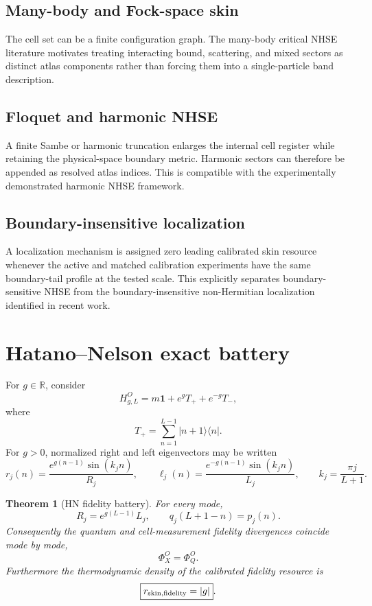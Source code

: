 \documentclass[11pt]{article}
\newtheorem{theorem}{Theorem}
\newcommand{\id}{\mathbf 1}
\newcommand{\R}{\mathbb R}
\begin{document}
\subsection{Many-body and Fock-space skin}
The cell set can be a finite configuration graph. The many-body critical NHSE literature motivates treating interacting bound, scattering, and mixed sectors as distinct atlas components rather than forcing them into a single-particle band description. \cite{ManyBodyCritical}

\subsection{Floquet and harmonic NHSE}
A finite Sambe or harmonic truncation enlarges the internal cell register while retaining the physical-space boundary metric. Harmonic sectors can therefore be appended as resolved atlas indices. This is compatible with the experimentally demonstrated harmonic NHSE framework. \cite{HarmonicNHSE}

\subsection{Boundary-insensitive localization}
A localization mechanism is assigned zero leading calibrated skin resource whenever the active and matched calibration experiments have the same boundary-tail profile at the tested scale. This explicitly separates boundary-sensitive NHSE from the boundary-insensitive non-Hermitian localization identified in recent work. \cite{BoundaryInsensitive}

\section{Hatano--Nelson exact battery}

For \(g\in\R\), consider
\[
H_{g,L}^{O}
=m\id+e^gT_++e^{-g}T_-,
\]
where
\[
T_+=\sum_{n=1}^{L-1}|n+1\rangle\langle n|.
\]
For \(g>0\), normalized right and left eigenvectors may be written
\[
r_j(n)=\frac{e^{g(n-1)}\sin(k_jn)}{R_j},
\qquad
\ell_j(n)=\frac{e^{-g(n-1)}\sin(k_jn)}{L_j},
\qquad
k_j=\frac{\pi j}{L+1}.
\]

\begin{theorem}[HN fidelity battery]
For every mode,
\[
R_j=e^{g(L-1)}L_j,
\qquad
q_j(L+1-n)=p_j(n).
\]
Consequently the quantum and cell-measurement fidelity divergences coincide mode by mode,
\[
\Phi_X^O=\Phi_Q^O.
\]
Furthermore the thermodynamic density of the calibrated fidelity resource is
\[
\boxed{r_{\rm skin,fidelity}=|g|}.
\]
\end{theorem}
\end{document}
